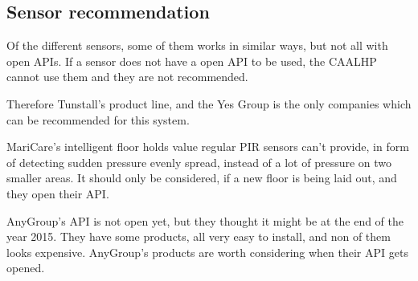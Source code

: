 \subsection{Sensor recommendation}

Of the different sensors, some of them works in similar ways, but not all with open APIs.
If a sensor does not have a open API to be used, the CAALHP cannot use them and they are not recommended.

Therefore Tunstall's product line, and the Yes Group is the only companies which can be recommended for this system.

MariCare's intelligent floor holds value regular PIR sensors can't provide, in form of detecting sudden pressure evenly spread, instead of a lot of pressure on two smaller areas.
It should only be considered, if a new floor is being laid out, and they open their API.

AnyGroup's API is not open yet, but they thought it might be at the end of the year 2015.
They have some products, all very easy to install, and non of them looks expensive.
AnyGroup's products are worth considering when their API gets opened.